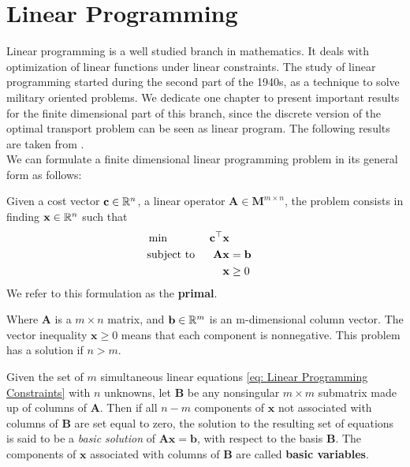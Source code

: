 \chapter{Linear Programming}
\label{ch: Linear Programming}
Linear programming is a well studied branch in mathematics. It deals with optimization of linear functions under linear constraints. The study of linear programming started during the second part of the 1940s, as a technique to solve military oriented problems. We dedicate one chapter to present important results for the finite dimensional part of this branch, since the discrete version of the optimal transport problem can be seen as linear program. The following results are taken from \cite{Luenberger2007LinNonLinProg}.  \\

We can formulate a finite dimensional linear programming problem in its general form as follows:

\begin{problem}
\label{pro: Linear Programming General Formulation.}
Given a cost vector $\mathbf{c}\in \mathbb{R}^n$, a linear operator $\mathbf{A} \in \mathbf M^{m\times n}$, the problem consists in finding $\mathbf{x}\in\mathbb{R}^n$ such that 
\begin{align}
	&\min & \mathbf{c}^\top\mathbf{x} \label{eq: Linear Programming Min}&\\
	&\text{subject to }& \mathbf{A}\mathbf{x}&=\mathbf{b} & \label{eq: Linear Programming Constraints} \\
	& &\mathbf{x}&\geq 0 & \label{eq: Linear Programming cone}
\end{align} 
We refer to this formulation as the \textbf{primal}.
\end{problem}
Where $\mathbf{A}$ is a $m\times n$ matrix, and $\mathbf{b}\in\mathbb{R}^m$ is an m-dimensional column vector. The vector inequality $\mathbf{x}\geq 0$ means that each component is nonnegative. This problem has a solution if $n>m$. 

\begin{definition}
	Given the set of $m$ simultaneous linear equations \eqref{eq: Linear Programming Constraints} with $n$ unknowns, let $\mathbf{B}$ be any nonsingular $m\times m$ submatrix made up of columns of $\mathbf{A}$. Then if all $n-m$ components of $\mathbf{x}$ not associated with columns of $\mathbf{B}$ are set equal to zero, the solution to the resulting set of equations is said to be a \textit{basic solution} of $\mathbf{Ax}=\mathbf{b}$, with respect to the basis $\mathbf{B}$. The components of $\mathbf{x}$ associated with columns of $\mathbf{B}$ are called \textbf{basic variables}.
\end{definition}

